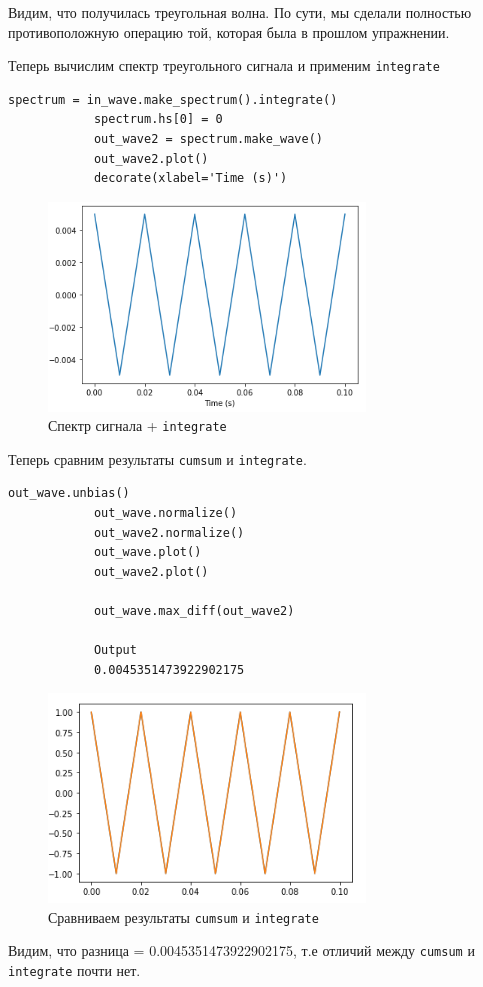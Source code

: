 \documentclass[a4paper,12pt]{article}
\begin{document}
\begin{enumerate}
		Видим, что получилась треугольная волна. По сути, мы сделали полностью противоположную операцию той, которая была в прошлом упражнении.
		
		
		Теперь вычислим спектр треугольного сигнала и применим \texttt{integrate}
		\begin{lstlisting}[caption=Спектр сигнала + \texttt{integrate}]
			spectrum = in_wave.make_spectrum().integrate()
			spectrum.hs[0] = 0
			out_wave2 = spectrum.make_wave()
			out_wave2.plot()
			decorate(xlabel='Time (s)')
		\end{lstlisting}
		\begin{figure}[H]
			\centering
			\includegraphics[width=0.75\textwidth]{3_3.png}
			\caption{Спектр сигнала + \texttt{integrate}}
			\label{fig:3.4}
		\end{figure}
		
		Теперь сравним результаты \texttt{cumsum} и \texttt{integrate}.
		\begin{lstlisting}[caption=Сравниваем результаты \texttt{cumsum} и \texttt{integrate}]
			out_wave.unbias()
			out_wave.normalize()
			out_wave2.normalize()
			out_wave.plot()
			out_wave2.plot()
			
			out_wave.max_diff(out_wave2)
			
			Output
			0.0045351473922902175
		\end{lstlisting}
		\begin{figure}[H]
			\centering
			\includegraphics[width=0.75\textwidth]{3_4.png}
			\caption{Сравниваем результаты \texttt{cumsum} и \texttt{integrate}}
			\label{fig:3.4}
		\end{figure}
		
		Видим, что разница = 0.0045351473922902175, т.е отличий между \texttt{cumsum} и \texttt{integrate} почти нет.
		
	\end{enumerate}
	\newpage
	
\end{document}
